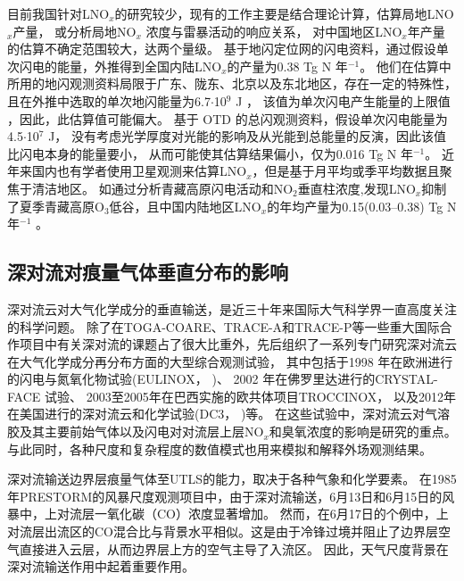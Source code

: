 目前我国针对LNO$_x$的研究较少，现有的工作主要是结合理论计算，估算局地LNO$_x$产量，
或分析局地NO$_x$ 浓度与雷暴活动的响应关系\citep{DuJian.2002,ZhangYiJun.2002,ZhouYunJun.2002}，
对中国地区LNO$_x$年产量的估算不确定范围较大，达两个量级。
\citet{ZhouYunJun.2004}基于地闪定位网的闪电资料，通过假设单次闪电的能量，外推得到全国内陆LNO$_x$的产量为0.38 Tg N 年$^{-1}$。
他们在估算中所用的地闪观测资料局限于广东、陇东、北京以及东北地区，存在一定的特殊性，
且在外推中选取的单次地闪能量为6.7$\cdot$10$^9$ J \citep{Price.1997a,Price.1997b}，
该值为单次闪电产生能量的上限值 \citep{Wang.1998}，因此，此估算值可能偏大。
\citet{SunAnPing.2004}基于 OTD 的总闪观测资料，假设单次闪电能量为4.5$\cdot$10$^7$ J，
没有考虑光学厚度对光能的影响及从光能到总能量的反演，因此该值比闪电本身的能量要小，
从而可能使其估算结果偏小，仅为0.016 Tg N 年$^{-1}$。
近年来国内也有学者使用卫星观测来估算LNO$_x$，但是基于月平均或季平均数据且聚焦于清洁地区。
如通过分析青藏高原闪电活动和NO$_2$垂直柱浓度,发现LNO$_x$抑制了夏季青藏高原O$_3$低谷，且中国内陆地区LNO$_x$的年均产量为0.15(0.03--0.38) Tg N 年$^{-1}$ \citep{JuXiaoYu.2015,Guo.2017,GuoFengXia.2019,Li.2022}。


\subsection{深对流对痕量气体垂直分布的影响}

深对流云对大气化学成分的垂直输送，是近三十年来国际大气科学界一直高度关注的科学问题。
除了在TOGA-COARE\citep{Webster.1992}、TRACE-A\citep{Fishman.1996}和TRACE-P\citep{Jacob.2003}等一些重大国际合作项目中有关深对流的课题占了很大比重外，先后组织了一系列专门研究深对流云在大气化学成分再分布方面的大型综合观测试验，
其中包括于1998 年在欧洲进行的闪电与氮氧化物试验(EULINOX，\citeauthor{Holler.2000} \citeyear{Holler.2000})、
2002 年在佛罗里达进行的CRYSTAL-FACE 试验\citep{Toon.2003}、
2003至2005年在巴西实施的欧共体项目TROCCINOX\citep{Huntrieser.2008}，
以及2012年在美国进行的深对流云和化学试验(DC3，\citeauthor{Barth.2019} \citeyear{Barth.2019})等。
在这些试验中，深对流云对气溶胶及其主要前始气体以及闪电对对流层上层NO$_x$和臭氧浓度的影响是研究的重点。
与此同时，各种尺度和复杂程度的数值模式也用来模拟和解释外场观测结果。

深对流输送边界层痕量气体至UTLS的能力，取决于各种气象和化学要素。
在1985年PRESTORM的风暴尺度观测项目中，由于深对流输送，6月13日和6月15日的风暴中，上对流层一氧化碳（CO）浓度显著增加\citep{Dickerson.1987,Pickering.1989}。
然而，在6月17日的个例中，上对流层出流区的CO混合比与背景水平相似。这是由于冷锋过境并阻止了边界层空气直接进入云层，从而边界层上方的空气主导了入流区\citep{Pickering.1988}。
因此，天气尺度背景在深对流输送作用中起着重要作用。


